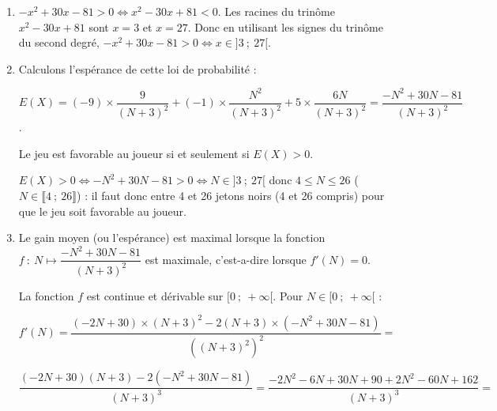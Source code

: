 \begin{enumerate}
\begin{enumerate}
	\begin{itemize}
		\item Pour perdre 9 euros, il faut tirer deux jetons blancs : $P(X=-9)=\left(\dfrac{3}{N+3}\right)^2=\dfrac{9}{(N + 3)^2}$
		\item Pour perdre un euro il faut tirer deux jetons noirs : $P(X=-1)=\left(\dfrac{N}{N+3}\right)^2=\dfrac{N^2}{(N + 3)^2}$
		\item pour gagner cinq euros, il faut tirer un jeton de chaque couleur (B + N ou N + B) :\\ $P(X=5)=2\times \dfrac{3}{N + 3} \times \dfrac{N}{N + 3}=\dfrac{6N}{(N + 3)^2}$
	\end{itemize}
La loi de probabilités est donc :
\begin{center}
\begin{tabular}{|l|c|c|c|}\hline
$X=x_i$&$- 9$&$-1$&5 \\ \hline
$P(X=x_i)$&$\dfrac{9}{(N+3)^2}$&$\dfrac{N^2}{(N+3)^2}$&$\dfrac{6N}{(N+3)^2}$ \\ \hline
\end{tabular}
\end{center}
\item $-x^2 + 30x - 81 > 0 \iff x^2-30x+81<0$. Les racines du trinôme $x^2-30x+81$ sont $x=3$ et $x=27$. Donc en utilisant les signes du trinôme du second degré, $-x^2+30x-81>0 \iff x\in ]3~;~27[$.
\item Calculons l'espérance de cette loi de probabilité :

 $E(X)=(-9)\times \dfrac{9}{(N+3)^2} + (-1)\times \dfrac{N^2}{(N+3)^2}+5 \times \dfrac{6N}{(N+3)^2}=\dfrac{-N^2+30N-81}{(N+3)^2}$.

Le jeu est favorable au joueur si et seulement si $E(X)>0$.

$E(X)>0 \iff -N^2+30N-81>0 \iff N\in ]3~;~27[$ donc $4\leqslant N \leqslant 26$ ($N \in \llbracket4~;~26 \rrbracket$) : il faut donc entre 4 et 26 jetons noirs (4 et 26 compris) pour que le jeu soit favorable au joueur.
\item Le gain moyen (ou l'espérance) est maximal lorsque la fonction $f~:~N\mapsto \dfrac{-N^2 + 30N - 81}{(N + 3)^2}$ est maximale, c'est-a-dire lorsque $f'(N) = 0$.

La fonction $f$ est continue et dérivable sur $[0~;~+\infty[$. Pour $N\in [0~;~+\infty[$ :

 $f'(N)=\dfrac{(-2N + 30)\times (N + 3)^2-2(N + 3)\times (-N^2 + 30N - 81)}{\left((N+3)^2\right)^2}=$

$\dfrac{(-2N + 30)(N + 3)-2(-N^2 + 30N - 81)}{(N+3)^3}
 =\dfrac{-2N^2 - 6N + 30N + 90 + 2N^2 - 60N + 162}{(N + 3)^3}=$


\end{enumerate}
\end{enumerate}
